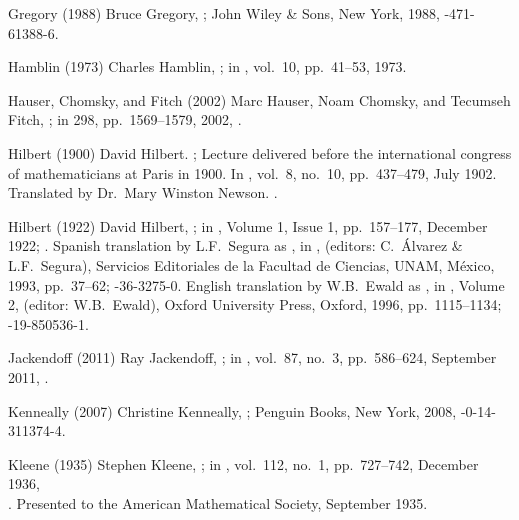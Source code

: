\biblabel Gregory (1988)
Bruce Gregory,
;
John Wiley \& Sons, New York, 1988,
-471-61388-6.

\biblabel Hamblin (1973)
Charles Hamblin,
;
in ,
vol.\ 10, pp.\ 41--53, 1973.

\biblabel Hauser, Chomsky, and Fitch (2002)
Marc Hauser, Noam Chomsky, and Tecumseh Fitch,
;
in  298, pp.\ 1569--1579, 2002,
.

\biblabel Hilbert (1900)
David Hilbert.
;
Lecture delivered before the international
congress of mathematicians at Paris in 1900.
In ,
vol.\ 8, no.\ 10, pp.\ 437--479, July 1902.
Translated by Dr.\ Mary Winston Newson.
.

\biblabel Hilbert (1922)
David Hilbert,
;
in ,
Volume 1, Issue 1, pp.~157--177, December 1922;
.
Spanish translation by L.F.\ Segura as
,
in ,
 (editors: C.\ Álvarez \& L.F.\ Segura),
Servicios Editoriales de la Facultad de Ciencias, UNAM,
México, 1993, pp.~37--62;
-36-3275-0.
English translation by W.B.\ Ewald as
,
in , Volume 2,
 (editor: W.B.\ Ewald),
Oxford University Press, Oxford, 1996, pp.~1115--1134;
-19-850536-1.

\biblabel Jackendoff (2011)
Ray Jackendoff,
;
in ,
vol.\ 87, no.\ 3, pp.\ 586--624, September 2011,
.

\biblabel Kenneally (2007)
Christine Kenneally,
;
Penguin Books, New York, 2008,
-0-14-311374-4.

\biblabel Kleene (1935)
Stephen Kleene,
;
in ,
vol.\ 112, no.\ 1, pp.\ 727--742, December 1936,\\
.
Presented to the American Mathematical Society,
September 1935.

